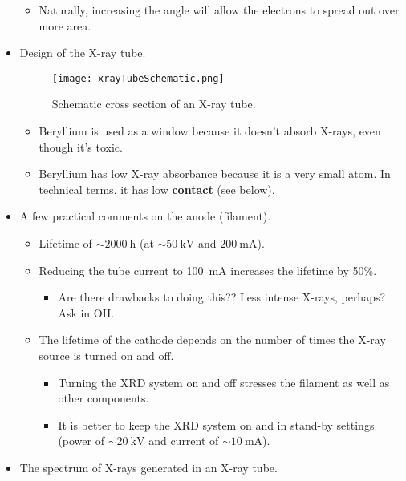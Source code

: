 \documentclass[../notes.tex]{subfiles}
\begin{document}
\begin{itemize}
\begin{itemize}
        \item Naturally, increasing the angle will allow the electrons to spread out over more area.
    \end{itemize}
    \item Design of the X-ray tube.
    \begin{figure}[h!]
        \centering
        \texttt{[image: xrayTubeSchematic.png]}
        \caption{Schematic cross section of an X-ray tube.}
        \label{fig:xrayTubeSchematic}
    \end{figure}
    \begin{itemize}
        \item Beryllium is used as a window because it doesn't absorb X-rays, even though it's toxic.
        \item Beryllium has low X-ray absorbance because it is a very small atom. In technical terms, it has low \textbf{contact} (see below).
    \end{itemize}
    \item A few practical comments on the anode (filament).
    \begin{itemize}
        \item Lifetime of $\sim\SI{2000}{\hour}$ (at $\sim\SI{50}{\kilo\volt}$ and $\SI{200}{\milli\ampere}$).
        \item Reducing the tube current to \SI{100}{\milli\ampere} increases the lifetime by 50\%.
        \begin{itemize}
            \item Are there drawbacks to doing this?? Less intense X-rays, perhaps? Ask in OH.
        \end{itemize}
        \item The lifetime of the cathode depends on the number of times the X-ray source is turned on and off.
        \begin{itemize}
            \item Turning the XRD system on and off stresses the filament as well as other components.
            \item It is better to keep the XRD system on and in stand-by settings (power of $\sim\SI{20}{\kilo\volt}$ and current of $\sim\SI{10}{\milli\ampere}$).
        \end{itemize}
    \end{itemize}
    \item The spectrum of X-rays generated in an X-ray tube.
    \begin{figure}[H]
        \centering

\end{figure}
\end{itemize}
\end{document}
